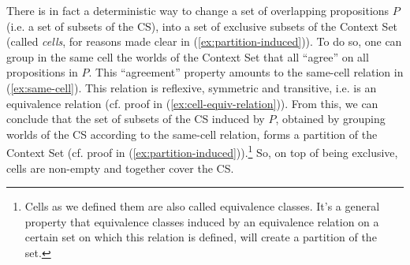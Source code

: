 There is in fact a deterministic way to change a set of overlapping propositions $P$ (i.e. a set of subsets of the CS), into a set of exclusive subsets of the Context Set (called \textit{cells}, for reasons made clear in (\ref{ex:partition-induced})). To do so, one can group in the same cell the worlds of the Context Set that all ``agree'' on all propositions in $P$. This ``agreement'' property amounts to the same-cell relation in (\ref{ex:same-cell}). This relation is reflexive, symmetric and transitive, i.e. is an equivalence relation (cf. proof in (\ref{ex:cell-equiv-relation})). From this, we can conclude that the set of subsets of the CS induced by $P$, obtained by grouping worlds of the CS according to the same-cell relation, forms a partition of the Context Set (cf. proof in (\ref{ex:partition-induced})).\footnote{Cells as we defined them are also called equivalence classes. It's a general property that equivalence classes induced by an equivalence relation on a certain set on which this relation is defined, will create a partition of the set.} So, on top of being exclusive, cells are non-empty and together cover the CS. 


